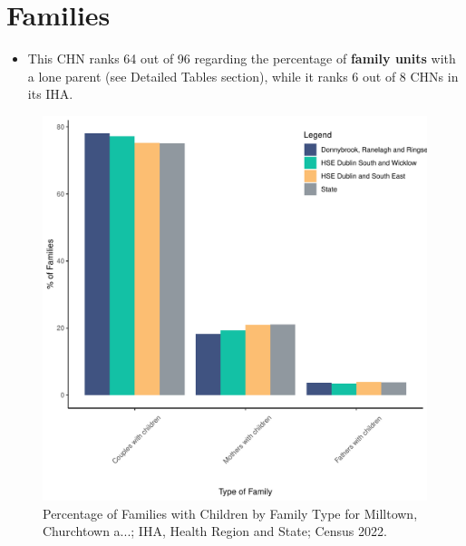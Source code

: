 \documentclass{article}
\begin{document}
\section{Families}\label{sect:Fam}
\begin{itemize}
\item This CHN ranks  64 out of 96 regarding the percentage of \textbf{family units} with a lone parent (see Detailed Tables section), while it ranks   6 out of 8 CHNs in its IHA.
\end{itemize}
\begin{figure}[H]
	\centering
	\includegraphics[width = 150mm]{../figures/FamED.pdf}
	\caption{Percentage of Families with Children by Family Type for Milltown, Churchtown a...; IHA, Health Region and State; Census 2022.}
	\label{fig:vbnv}
	\end{figure}
	
\end{document}
